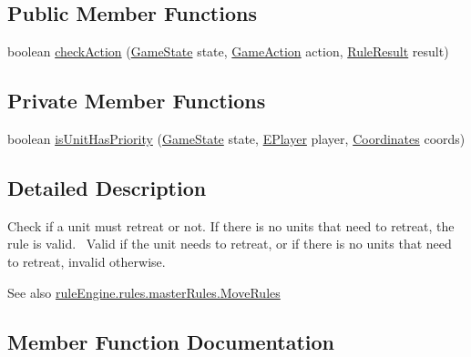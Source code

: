 \subsection*{Public Member Functions}
\begin{DoxyCompactItemize}
\item 
boolean \mbox{\hyperlink{classrule_engine_1_1rules_1_1atomic_rules_1_1_check_is_priority_unit_aab6e78a775704e1e740c3f52e664d04c}{check\+Action}} (\mbox{\hyperlink{classgame_1_1game_state_1_1_game_state}{Game\+State}} state, \mbox{\hyperlink{classrule_engine_1_1_game_action}{Game\+Action}} action, \mbox{\hyperlink{classrule_engine_1_1_rule_result}{Rule\+Result}} result)
\end{DoxyCompactItemize}
\subsection*{Private Member Functions}
\begin{DoxyCompactItemize}
\item 
boolean \mbox{\hyperlink{classrule_engine_1_1rules_1_1atomic_rules_1_1_check_is_priority_unit_ab4053d812e96d43c5c89e6919e6796e2}{is\+Unit\+Has\+Priority}} (\mbox{\hyperlink{classgame_1_1game_state_1_1_game_state}{Game\+State}} state, \mbox{\hyperlink{enumgame_1_1_e_player}{E\+Player}} player, \mbox{\hyperlink{classrule_engine_1_1_coordinates}{Coordinates}} coords)
\end{DoxyCompactItemize}


\subsection{Detailed Description}
Check if a unit must retreat or not. If there is no units that need to retreat, the rule is valid.~\newline
 Valid if the unit needs to retreat, or if there is no units that need to retreat, invalid otherwise. \begin{DoxySeeAlso}{See also}
\mbox{\hyperlink{classrule_engine_1_1rules_1_1master_rules_1_1_move_rules}{rule\+Engine.\+rules.\+master\+Rules.\+Move\+Rules}} 
\end{DoxySeeAlso}


\subsection{Member Function Documentation}
\mbox{\label{classrule_engine_1_1rules_1_1atomic_rules_1_1_check_is_priority_unit_aab6e78a775704e1e740c3f52e664d04c}} 

